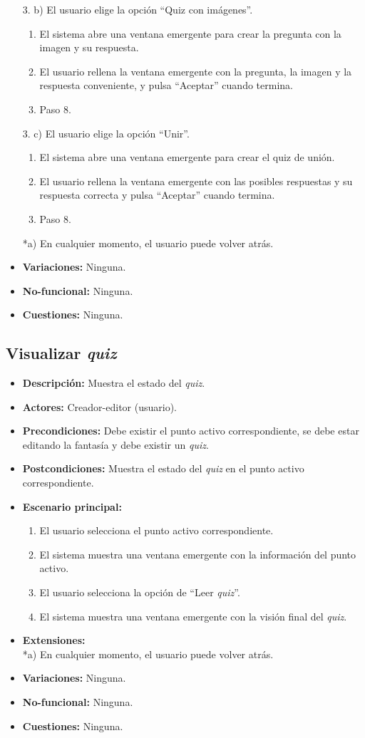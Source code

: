 \begin{itemize}
	3. b) El usuario elige la opción ``Quiz con imágenes''.
	\begin{enumerate}
		\item El sistema abre una ventana emergente para crear la pregunta con la imagen y su respuesta.
		\item El usuario rellena la ventana emergente con la pregunta, la imagen y la respuesta conveniente, y pulsa ``Aceptar'' cuando termina.
		\item Paso 8.
	\end{enumerate}
	3. c) El usuario elige la opción ``Unir''.
	\begin{enumerate}
		\item El sistema abre una ventana emergente para crear el quiz de unión.
		\item El usuario rellena la ventana emergente con las posibles respuestas y su respuesta correcta y pulsa ``Aceptar'' cuando termina.
		\item Paso 8.
	\end{enumerate}
	*a) En cualquier momento, el usuario puede volver atrás.
	\item \textbf{Variaciones:} Ninguna.
	\item \textbf{No-funcional:} Ninguna.
	\item \textbf{Cuestiones:} Ninguna.
\end{itemize}

\subsection{Visualizar \textit{quiz}}
\begin{itemize}
	\item \textbf{Descripción:} Muestra el estado del \textit{quiz}.
	\item \textbf{Actores:} Creador-editor (usuario).
	\item \textbf{Precondiciones:} Debe existir el punto activo correspondiente, se debe estar editando la fantasía y debe existir un \textit{quiz}.
	\item \textbf{Postcondiciones:} Muestra el estado del \textit{quiz} en el punto activo correspondiente.
	\item \textbf{Escenario principal:}
	\begin{enumerate}
		\item El usuario selecciona el punto activo correspondiente.
		\item El sistema muestra una ventana emergente con la información del punto activo.
		\item El usuario selecciona la opción de ``Leer \textit{quiz}''.
		\item El sistema muestra una ventana emergente con la visión final del \textit{quiz}.
	\end{enumerate}
	\item \textbf{Extensiones:} \\ *a) En cualquier momento, el usuario puede volver atrás.
	\item \textbf{Variaciones:} Ninguna.
	\item \textbf{No-funcional:} Ninguna.
	\item \textbf{Cuestiones:} Ninguna.
\end{itemize}

